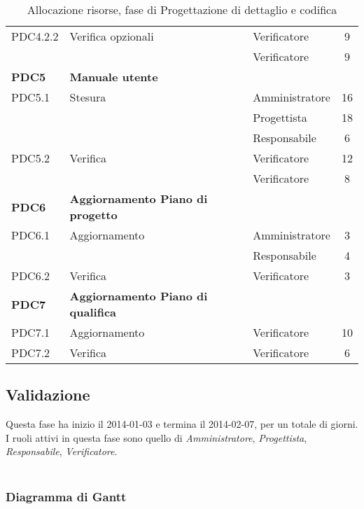 \begin{table}[H]
\begin{tabular}{ l l l c  }
	\cline{3-4}
	PDC4.2.2 & Verifica opzionali & Verificatore & 9\\	
	& & Verificatore & 9\\
	\hline
	\textbf{PDC5} & \textbf{Manuale utente} \\
	\cline{3-4}
	PDC5.1 & Stesura  & Amministratore & 16\\ 
	 & & Progettista & 18\\
	 & & Responsabile & 6\\
    \cline{3-4}
	PDC5.2 & Verifica & Verificatore &  12\\
	& & Verificatore & 8\\
	\hline
	\textbf{PDC6} & \textbf{Aggiornamento Piano di progetto} \\
	\cline{3-4}
	PDC6.1 & Aggiornamento  & Amministratore & 3\\ 
	 & & Responsabile & 4\\
    \cline{3-4}
	PDC6.2 & Verifica & Verificatore &  3\\
	\hline
	\textbf{PDC7} & \textbf{Aggiornamento Piano di qualifica} \\
	\cline{3-4}
	PDC7.1 & Aggiornamento  & Verificatore & 10\\ 
    \cline{3-4}
	PDC7.2 & Verifica & Verificatore &  6\\
	\hline
	\end{tabular}
	\caption{Allocazione risorse, fase di Progettazione di dettaglio e codifica}
	\end{table}	
	
	
	\subsection{Validazione}
	
Questa fase ha inizio il 2014-01-03 e termina il 2014-02-07, per un totale di   giorni. \\
I ruoli attivi in questa fase sono quello di \textit{Amministratore}, \textit{Progettista}, \textit{Responsabile}, \textit{Verificatore}. \\ \\

\subsubsection{Diagramma di Gantt}

